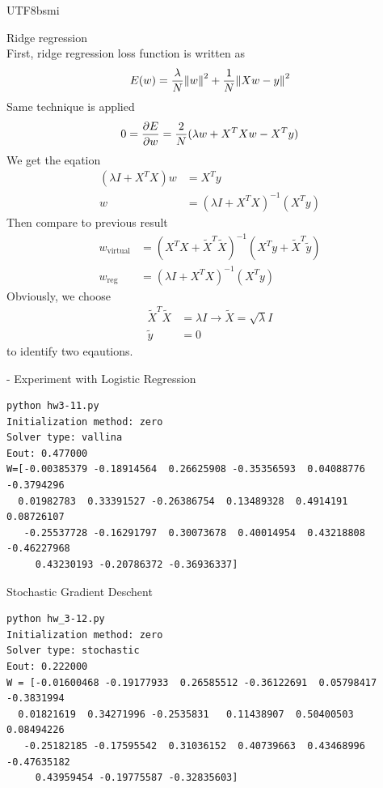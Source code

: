\documentclass[12pt]{article}
\newenvironment{prob}[2][Prob.]{\begin{trivlist}
\item[\hskip \labelsep {\bfseries #1}\hskip \labelsep {\bfseries #2}]}{\end{trivlist}}
\begin{document}
\begin{CJK}{UTF8}{bsmi}
\begin{prob}{10} Ridge regression \\
First, ridge regression loss function is written as 
\[
    E(w) = \frac{\lambda}{N}\norm{w}^2 + \frac{1}{N}\norm{Xw-y}^2
\]
Same technique is applied
\[
    0 = \pdv{E}{w} = \frac{2}{N} (\lambda w + X^TXw -X^Ty)
\]
We get the eqation
\begin{align*}
    (\lambda I + X^TX)w & = X^Ty \\
    w &= (\lambda I + X^TX)^{-1}(X^Ty)
\end{align*}
Then compare to previous result
\begin{align*}
    w_{\text{virtual}} &= (X^TX + \tilde{X}^T\tilde{X})^{-1}( X^Ty + \tilde{X}^T\tilde{y}) \\
    w_{\text{reg}} &= (\lambda I + X^TX)^{-1}(X^Ty)
\end{align*}
Obviously, we choose 
\begin{align*}
    \tilde{X}^T\tilde{X} &= \lambda I \rightarrow \tilde{X} = \sqrt{\lambda} I \\
    \tilde{y}& = 0
\end{align*}
to identify two eqautions.
\end{prob}

\begin{prob}{11} - Experiment with Logistic Regression\\
\begin{lstlisting}
python hw3-11.py
Initialization method: zero
Solver type: vallina
Eout: 0.477000
W=[-0.00385379 -0.18914564  0.26625908 -0.35356593  0.04088776 -0.3794296
  0.01982783  0.33391527 -0.26386754  0.13489328  0.4914191   0.08726107
   -0.25537728 -0.16291797  0.30073678  0.40014954  0.43218808 -0.46227968
     0.43230193 -0.20786372 -0.36936337]
\end{lstlisting}

\end{prob}

\begin{prob}{12} Stochastic Gradient Deschent \\

\begin{lstlisting}
python hw_3-12.py
Initialization method: zero
Solver type: stochastic
Eout: 0.222000
W = [-0.01600468 -0.19177933  0.26585512 -0.36122691  0.05798417 -0.3831994
  0.01821619  0.34271996 -0.2535831   0.11438907  0.50400503  0.08494226
   -0.25182185 -0.17595542  0.31036152  0.40739663  0.43468996 -0.47635182
     0.43959454 -0.19775587 -0.32835603]
\end{lstlisting}
\end{prob}


\end{CJK}
\end{document}
